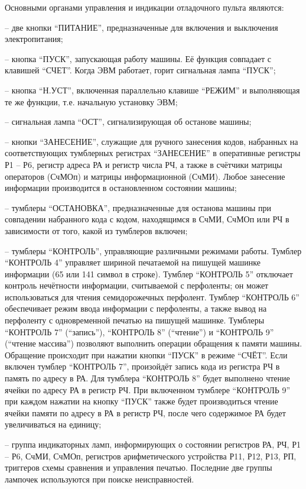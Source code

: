 \documentclass[11pt]{article}
\begin{document}
Основными органами управления и
индикации отладочного пульта являются:

– две кнопки “ПИТАНИЕ”,
предназначенные для включения и
выключения электропитания;

– кнопка “ПУСК”, запускающая работу
машины. Её функция совпадает с клавишей
“СЧЕТ”. Когда ЭВМ работает, горит
сигнальная лампа “ПУСК”;

– кнопка “Н.УСТ”, включенная
параллельно клавише “РЕЖИМ” и
выполняющая те же функции, т.е.
начальную установку ЭВМ;

– сигнальная лампа “ОСТ”,
сигнализирующая об останове машины;

– кнопки “ЗАНЕСЕНИЕ”, служащие для
ручного занесения кодов, набранных на
соответствующих тумблерных регистрах
“ЗАНЕСЕНИЕ” в оперативные регистры Р1
– Р6, регистр адреса РА и регистр числа
РЧ, а также в счётчики матрицы
операторов (СчМОп) и матрицы
информационной (СчМИ). Любое занесение
информации производится в
остановленном состоянии машины;

– тумблеры “ОСТАНОВКА”,
предназначенные для останова машины
при совпадении набранного кода с кодом,
находящимся в СчМИ, СчМОп или РЧ в
зависимости от того, какой из тумблеров
включен;

– тумблеры “КОНТРОЛЬ”, управляющие
различными режимами работы. Тумблер
“КОНТРОЛЬ 4” управляет шириной
печатаемой на пишущей машинке
информации (65 или 141 символ в строке).
Тумблер “КОНТРОЛЬ 5” отключает
контроль нечётности информации,
считываемой с перфоленты; он может
использоваться для чтения
семидорожечных перфолент. Тумблер
“КОНТРОЛЬ 6” обеспечивает режим ввода
информации с перфоленты, а также вывод
на перфоленту с одновременной печатью
на пишущей машинке. Тумблеры “КОНТРОЛЬ
7” (“запись”), “КОНТРОЛЬ 8” (“чтение”)
и “КОНТРОЛЬ 9” (“чтение массива”)
позволяют выполнить операции
обращения к памяти машины. Обращение
происходит при нажатии кнопки “ПУСК”
в режиме “СЧЁТ”. Если включен тумблер
“КОНТРОЛЬ 7”, произойдёт запись кода
из регистра РЧ в память по адресу в РА.
Для тумблера “КОНТРОЛЬ 8” будет
выполнено чтение ячейки по адресу РА в
регистр РЧ. При включенном тумблере
“КОНТРОЛЬ 9” при каждом нажатии на
кнопку “ПУСК” также будет
производиться чтение ячейки памяти по
адресу в РА в регистр РЧ, после чего
содержимое РА будет увеличиваться на
единицу;

– группа индикаторных ламп,
информирующих о состоянии регистров
РА, РЧ, Р1 – Р6, СчМИ, СчМОп, регистров
арифметического устройства Р11, Р12, Р13,
РП, триггеров схемы сравнения и
управления печатью. Последние две
группы лампочек используются при
поиске неисправностей.
\end{document}

